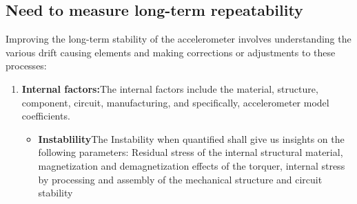 \documentclass{FR16}
\begin{document}
\subsection{Need to measure long-term repeatability}
Improving the long-term stability of the accelerometer involves understanding the various drift causing elements and making corrections or adjustments to these processes:
\begin{enumerate}
    \item \textbf{Internal factors:}The internal factors include the material, structure, component, circuit, manufacturing, and  specifically, accelerometer model coefficients.
     \begin{itemize}
         \item \textbf{Instablility}The Instability when quantified shall give us insights on the following parameters: Residual stress of the internal structural material, magnetization and demagnetization effects of
         the torquer, internal stress by processing and assembly of the mechanical structure and circuit stability
     \end{itemize}
    

\end{enumerate}
\end{document}
